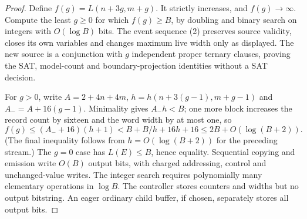 \documentclass[11pt]{article}
\begin{document}
\begin{proof}
Define $f(g)=L(n+3g,m+g)$. It strictly increases, and
$f(g)\rightarrow\infty$. Compute the least $g\ge0$ for
which $f(g)\ge B$, by doubling and binary search on
integers with $O(\log B)$ bits. The event sequence (2)
preserves source validity, closes its own variables and
changes maximum live width only as displayed. The new
source is a conjunction with $g$ independent
proper ternary clauses, proving the SAT, model-count
and boundary-projection identities without a SAT
decision.

For $g>0$, write $A=2+4n+4m$, $h=h(n+3(g-1),m+g-1)$ and
$A_-=A+16(g-1)$. Minimality gives $A_-h<B$; one more
block increases the record count by sixteen and the
word width by at most one, so
\[
 f(g)\le(A_-+16)(h+1)
 < B+B/h+16h+16
 \le 2B+O(\log(B+2)).
\]
(The final inequality follows from
$h=O(\log(B+2))$ for the preceding stream.)
The $g=0$ case has $L(E)\le B$, hence equality. Sequential
copying and emission write $O(B)$ output bits, with
charged addressing, control and unchanged-value writes.
The integer search requires polynomially many elementary
operations in $\log B$. The controller stores counters
and widths but no output bitstring. An eager ordinary
child buffer, if chosen, separately stores all output bits.
\end{proof}
\end{document}
